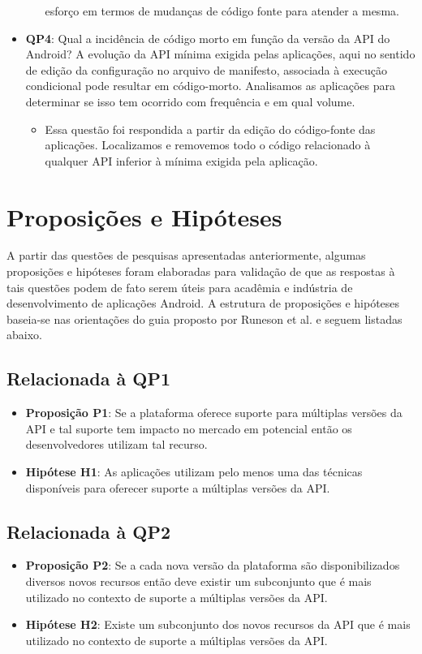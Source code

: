 \begin{itemize}
\begin{itemize}
			esforço em termos de mudanças de código fonte para atender a mesma.
		\end{itemize}
	\item \textbf{QP4}: Qual a incidência de código morto em função da versão da API do Android? 
	A evolução da API mínima exigida pelas aplicações, aqui no sentido de edição da configuração
	no arquivo de manifesto, associada à execução condicional pode resultar em código-morto.
	Analisamos as aplicações para determinar se isso tem ocorrido com frequência e em qual volume.
		\begin{itemize}
			\item Essa questão foi respondida a partir da edição do código-fonte das aplicações.
			Localizamos e removemos todo o código relacionado à qualquer API inferior à mínima
			exigida pela aplicação.
		\end{itemize}
\end{itemize}

\section{Proposições e Hipóteses} \label{sec:hipoteses}

A partir das questões de pesquisas apresentadas anteriormente, algumas proposições
e hipóteses foram elaboradas para validação de que as respostas à tais questões podem
de fato serem úteis para acadêmia e indústria de desenvolvimento de aplicações Android.
A estrutura de proposições e hipóteses baseia-se nas orientações do guia proposto por 
Runeson et al. \cite{Runeson2012} e seguem listadas abaixo.

\subsection{Relacionada à QP1}
	\begin{itemize}
		\item \textbf{Proposição P1}: Se a plataforma oferece suporte para múltiplas versões
		da API e tal suporte tem impacto no mercado em potencial então os desenvolvedores
		utilizam tal recurso.
		\item \textbf{Hipótese H1}: As aplicações utilizam pelo menos uma das técnicas disponíveis
		para oferecer suporte a múltiplas versões da API.
	\end{itemize}

\subsection{Relacionada à QP2}
	\begin{itemize}
		\item \textbf{Proposição P2}: Se a cada nova versão da plataforma são disponibilizados
		diversos novos recursos então deve existir um subconjunto que é mais utilizado no 
		contexto de suporte a múltiplas versões da API.
		\item \textbf{Hipótese H2}: Existe um subconjunto dos novos recursos da API que é
		mais utilizado no contexto de suporte a múltiplas versões da API.
	\end{itemize}

